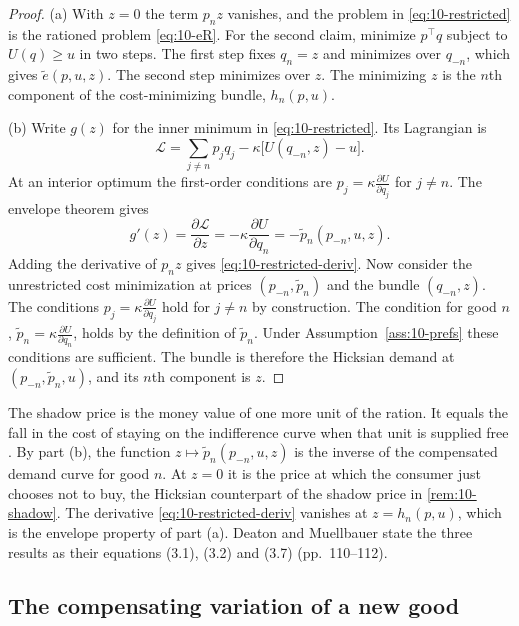 \begin{proof}
(a) With $z = 0$ the term $p_nz$ vanishes, and the problem in \eqref{eq:10-restricted} is the rationed problem
\eqref{eq:10-eR}. For the second claim, minimize $p^\top q$ subject to $U(q) \ge u$ in two steps. The first step
fixes $q_n = z$ and minimizes over $q_{-n}$, which gives $\tilde e(p,u,z)$. The second step minimizes over $z$. The
minimizing $z$ is the $n$th component of the cost-minimizing bundle, $h_n(p,u)$.

(b) Write $g(z)$ for the inner minimum in \eqref{eq:10-restricted}. Its Lagrangian is
\begin{equation*}
  \mathcal{L} = \sum_{j\neq n}p_jq_j - \kappa\bigl[U(q_{-n},z) - u\bigr].
\end{equation*}
At an interior optimum the first-order conditions are $p_j = \kappa\frac{\partial U}{\partial q_j}$ for $j \neq n$.
The envelope theorem gives
\begin{equation*}
  g'(z) = \frac{\partial\mathcal{L}}{\partial z} = -\kappa\frac{\partial U}{\partial q_n} = -\tilde p_n(p_{-n},u,z).
\end{equation*}
Adding the derivative of $p_nz$ gives \eqref{eq:10-restricted-deriv}. Now consider the unrestricted cost
minimization at prices $(p_{-n},\tilde p_n)$ and the bundle $(q_{-n},z)$. The conditions
$p_j = \kappa\frac{\partial U}{\partial q_j}$ hold for $j \neq n$ by construction. The condition for good $n$,
$\tilde p_n = \kappa\frac{\partial U}{\partial q_n}$, holds by the definition of $\tilde p_n$. Under
Assumption~\ref{ass:10-prefs} these conditions are sufficient. The bundle is therefore the Hicksian demand at
$(p_{-n},\tilde p_n,u)$, and its $n$th component is $z$.
\end{proof}

The shadow price is the money value of one more unit of the ration. It equals the fall in the cost of staying on
the indifference curve when that unit is supplied free \citep[p.~113]{DeatonMuellbauer1980b}. By part (b), the
function $z \mapsto \tilde p_n(p_{-n},u,z)$ is the inverse of the compensated demand curve for good $n$. At $z = 0$ it
is the price at which the consumer just chooses not to buy, the Hicksian counterpart of the shadow price in
\cref{rem:10-shadow}. The derivative \eqref{eq:10-restricted-deriv} vanishes at $z = h_n(p,u)$, which is the envelope
property of part (a). Deaton and Muellbauer state the three results as their equations (3.1), (3.2) and (3.7)
(pp.~110--112).

\subsection{The compensating variation of a new good}\label{sec:10-cv}

